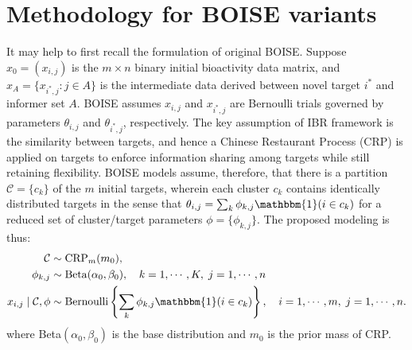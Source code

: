 \documentclass[11pt,a4paper]{article}
\theoremstyle{plain}
\begin{document}
\section{Methodology for BOISE variants}
It may help to first recall the formulation of original BOISE. %
Suppose $x_0 = (x_{i,j})$ is the $m\times n$ binary initial bioactivity data matrix, and $x_A = \{x_{i^*,j}:j\in A\}$ is the intermediate data derived between novel target $i^*$ and informer set $A$.
BOISE assumes $x_{i,j}$ and $x_{i^*,j}$ are Bernoulli trials governed by parameters $\theta_{i,j}$ and $\theta_{i^*,j}$, respectively. 
The key assumption of IBR framework is the similarity between targets, and hence a Chinese Restaurant Process (CRP) is applied on targets to enforce information sharing among targets while still retaining flexibility. 
BOISE models assume, therefore, that there is a partition $\mathcal{C} = \{ c_k \}$ of the $m$ initial targets, wherein each cluster $c_k$ contains identically distributed targets in the sense that $\theta_{i,j} = \sum_k \phi_{k,j}\mathbbm{1}(i\in c_k)$ for a reduced set of cluster/target parameters $\phi=\{ \phi_{k,j} \}$. 
The proposed modeling is thus:
\begin{align}
\label{eq:orig_model_structure}
\begin{split}
\mathcal{C} &\sim {\rm CRP}_m(m_0), \\  
    \phi_{k,j} & \sim {\rm Beta}(\alpha_0,\beta_0), \quad  k=1,\cdots, K, \; j=1,\cdots,n \\
x_{i,j} \mid  \mathcal{C}, \phi  & \sim {\mbox {\rm Bernoulli}} \left\{ \sum_k \phi_{k,j} \mathbbm{1}(i\in c_k) \right\},
 \quad i=1,\cdots,m, \; j=1,\cdots,n.
\end{split}
\end{align}
where Beta$(\alpha_0, \beta_0)$ is the base distribution and $m_0$ is the prior mass of CRP. 
\end{document}
